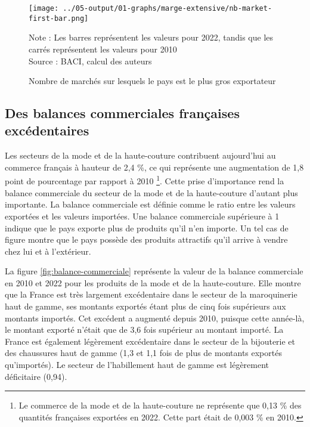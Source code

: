 \documentclass[french,10pt,a4paper]{article}
\begin{document}
\begin{figure}[!h]
  \centering  \texttt{[image: ../05-output/01-graphs/marge-extensive/nb-market-first-bar.png]}
  \captionsetup{justification=justified, singlelinecheck=false, font=small}
  \caption*{Note : Les barres représentent les valeurs pour 2022, tandis que les carrés représentent les valeurs pour 2010 \\
  Source : BACI, calcul des auteurs}
  \captionsetup{justification=centering, singlelinecheck=true, font=normalsize}
  \caption{Nombre de marchés sur lesquels le pays est le plus gros exportateur}
  \label{fig:nb-market-first-bar}
\end{figure}


\subsection{Des balances commerciales françaises excédentaires}
Les secteurs de la mode et de la haute-couture contribuent aujourd'hui au commerce français à hauteur de 2,4 \%, ce qui représente une augmentation de 1,8 point de pourcentage par rapport à 2010 \footnote{Le commerce de la mode et de la haute-couture ne représente que 0,13 \% des quantités françaises exportées en 2022. Cette part était de 0,003 \% en 2010.}. Cette prise d'importance rend la balance commerciale du secteur de la mode et de la haute-couture d'autant plus importante. La balance commerciale est définie comme le ratio entre les valeurs exportées et les valeurs importées. Une balance commerciale supérieure à 1 indique que le pays exporte plus de produits qu'il n'en importe. Un tel cas de figure montre que le pays possède des produits attractifs qu'il arrive à vendre chez lui et à l'extérieur.

\bigskip

La figure \ref{fig:balance-commerciale} représente la valeur de la balance commerciale en 2010 et 2022 pour les produits de la mode et de la haute-couture. Elle montre que la France est très largement excédentaire dans le secteur de la maroquinerie haut de gamme, ses montants exportés étant plus de cinq fois supérieurs aux montants importés. Cet excédent a augmenté depuis 2010, puisque cette année-là, le montant exporté n'était que de 3,6 fois supérieur au montant importé. La France est également légèrement excédentaire dans le secteur de la bijouterie et des chaussures haut de gamme (1,3 et 1,1 fois de plus de montants exportés qu'importés). Le secteur de l'habillement haut de gamme est légèrement déficitaire (0,94).
\end{document}

